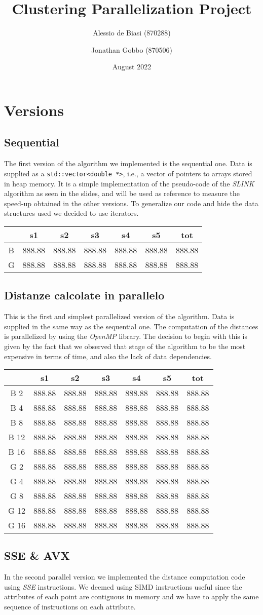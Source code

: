 \documentclass{article}
\title{Clustering Parallelization Project}
\author{Alessio de Biasi (870288) \and Jonathan Gobbo (870506)}
\date{August 2022}
\newcommand{\loremTable}{
\begin{table}[H]
    \centering
    \begin{tabular}[H]{ccccccc}
\hline
& s1 & s2 & s3 & s4 & s5 & tot \\
\hline
B 2 & 888.88 & 888.88 & 888.88 & 888.88 & 888.88 & 888.88 \\
B 4 & 888.88 & 888.88 & 888.88 & 888.88 & 888.88 & 888.88 \\
B 8 & 888.88 & 888.88 & 888.88 & 888.88 & 888.88 & 888.88 \\
B 12 & 888.88 & 888.88 & 888.88 & 888.88 & 888.88 & 888.88 \\
B 16 & 888.88 & 888.88 & 888.88 & 888.88 & 888.88 & 888.88 \\
G 2 & 888.88 & 888.88 & 888.88 & 888.88 & 888.88 & 888.88 \\
G 4 & 888.88 & 888.88 & 888.88 & 888.88 & 888.88 & 888.88 \\
G 8 & 888.88 & 888.88 & 888.88 & 888.88 & 888.88 & 888.88 \\
G 12 & 888.88 & 888.88 & 888.88 & 888.88 & 888.88 & 888.88 \\
G 16 & 888.88 & 888.88 & 888.88 & 888.88 & 888.88 & 888.88 \\
\hline
\end{tabular}
    \label{tab:my_label}
\end{table}
}
\newcommand{\loremTableSequential}{
\begin{table}[H]
    \centering
    \begin{tabular}[H]{ccccccc}
\hline
& s1 & s2 & s3 & s4 & s5 & tot \\
\hline
B & 888.88 & 888.88 & 888.88 & 888.88 & 888.88 & 888.88 \\
G & 888.88 & 888.88 & 888.88 & 888.88 & 888.88 & 888.88 \\
\hline
\end{tabular}
    \label{tab:my_label}
\end{table}
}
\begin{document}
\twocolumn
\maketitle


\hypertarget{versions}{%
\section{Versions}\label{versions}}

\hypertarget{sequential}{%
\subsection{Sequential}\label{sequential}}

The first version of the algorithm we implemented is the sequential one.
Data is supplied as a
\texttt{std::vector\textless{}double\ *\textgreater{}}, i.e., a vector
of pointers to arrays stored in heap memory. It is a simple
implementation of the pseudo-code of the \emph{SLINK} algorithm as seen
in the slides, and will be used as reference to measure the speed-up
obtained in the other versions. To generalize our code and hide the data
structures used we decided to use iterators.

\loremTableSequential

\hypertarget{distanze-calcolate-in-parallelo}{%
\subsection{Distanze calcolate in
parallelo}\label{distanze-calcolate-in-parallelo}}

This is the first and simplest parallelized version of the algorithm.
Data is supplied in the same way as the sequential one. The computation
of the distances is parallelized by using the \emph{OpenMP} library. The
decision to begin with this is given by the fact that we observed that
stage of the algorithm to be the most expensive in terms of time, and
also the lack of data dependencies.

\loremTable

\hypertarget{sse-avx}{%
\subsection{SSE \& AVX}\label{sse-avx}}

In the second parallel version we implemented the distance computation
code using \emph{SSE} instructions. We deemed using SIMD instructions
useful since the attributes of each point are contiguous in memory and
we have to apply the same sequence of instructions on each attribute.
\end{document}
